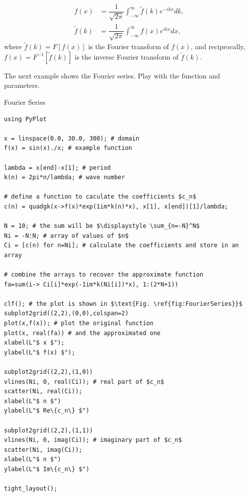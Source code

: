 \begin{align}
 f(x) &= \dfrac{1}{\sqrt{2\pi}} \int_{-\infty}^{\infty} \tilde{f}(k) e^{-i k x} dk,\\
 \tilde{f}(k) &= \dfrac{1}{\sqrt{2\pi}} \int_{-\infty}^{\infty} f(x) e^{i k x} dx,
\end{align}
where $\tilde{f}(k) = F[f(x)]$ is the Fourier transform of $f(x)$, and reciprocally, $f(x) = F^{-1}[\tilde{f}(k)]$ is the inverse Fourier transform of $\tilde{f}(k)$.

The next example shows the Fourier series. Play with the function and parameters.

\begin{example}{Fourier Series}
\label{ex:FourierSeries}
\begin{verbatim}
using PyPlot

x = linspace(0.0, 30.0, 300); # domain
f(x) = sin(x)./x; # example function

lambda = x[end]-x[1]; # period
k(n) = 2pi*n/lambda; # wave number

# define a function to caculate the coefficients $c_n$
c(n) = quadgk(x->f(x)*exp(1im*k(n)*x), x[1], x[end])[1]/lambda;

N = 10; # the sum will be $\displaystyle \sum_{n=-N}^N$
Ni = -N:N; # array of values of $n$
Ci = [c(n) for n=Ni]; # calculate the coefficients and store in an array

# combine the arrays to recover the approximate function
fa=sum(i-> Ci[i]*exp(-1im*k(Ni[i])*x), 1:(2*N+1))

clf(); # the plot is shown in $\text{Fig. \ref{fig:FourierSeries}}$
subplot2grid((2,2),(0,0),colspan=2)
plot(x,f(x)); # plot the original function
plot(x, real(fa)) # and the approximated one
xlabel(L"$ x $");
ylabel(L"$ f(x) $");

subplot2grid((2,2),(1,0))
vlines(Ni, 0, real(Ci)); # real part of $c_n$
scatter(Ni, real(Ci));
xlabel(L"$ n $")
ylabel(L"$ Re\{c_n\} $")

subplot2grid((2,2),(1,1))
vlines(Ni, 0, imag(Ci)); # imaginary part of $c_n$
scatter(Ni, imag(Ci));
xlabel(L"$ n $")
ylabel(L"$ Im\{c_n\} $")

tight_layout();
\end{verbatim}
\end{example}

